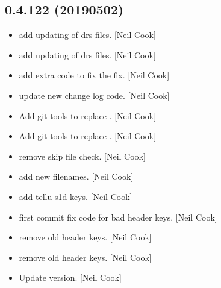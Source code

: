 \documentclass[a4paper,10pt,english]{report}
\begin{document}
\subsection{0.4.122 (2019\sphinxhyphen{}05\sphinxhyphen{}02)}
\label{\detokenize{misc/changelog:id157}}\begin{itemize}
\item {} 
 \sphinxhyphen{} add updating of drs files. {[}Neil Cook{]}

\item {} 
 \sphinxhyphen{} add updating of drs files. {[}Neil Cook{]}

\item {} 
 \sphinxhyphen{} add extra code to fix the fix. {[}Neil Cook{]}

\item {} 
 \sphinxhyphen{} update new change log code. {[}Neil Cook{]}

\item {} 
Add git tools to replace . {[}Neil Cook{]}

\item {} 
Add git tools to replace . {[}Neil Cook{]}

\item {} 
 \sphinxhyphen{} remove skip file check. {[}Neil Cook{]}

\item {} 
 \sphinxhyphen{} add new filenames. {[}Neil Cook{]}

\item {} 
 \sphinxhyphen{} add tellu s1d keys. {[}Neil Cook{]}

\item {} 
 \sphinxhyphen{} first commit fix code for bad header keys.
{[}Neil Cook{]}

\item {} 
 \sphinxhyphen{} remove old header keys. {[}Neil Cook{]}

\item {} 
 \sphinxhyphen{} remove old header keys. {[}Neil Cook{]}

\item {} 
Update version. {[}Neil Cook{]}

\end{itemize}
\end{document}

